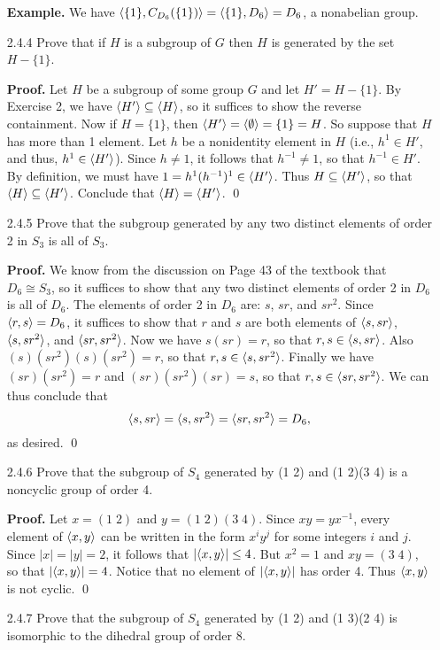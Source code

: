 \begin{enumerate}
      \textbf{Example.} We have $\langle \{1\}, C_{D_6}(\{1\}) \rangle =
      \langle \{1\}, D_6 \rangle= D_6$, a nonabelian group.
   \item[2.4.4]   Prove that if $H$ is a subgroup of $G$ then $H$ is generated
                  by the set $H - \{1\}$.

      \textbf{Proof.} Let $H$ be a subgroup of some group $G$ and let
      $H' = H - \{1\}$. By Exercise 2, we have $\langle H' \rangle \subseteq \langle H \rangle$, so
      it suffices to show the reverse containment. Now if $H = \{1\}$, then
      $\langle H' \rangle = \langle \emptyset \rangle = \{1\} = H$. So suppose that $H$ has more
      than 1 element. Let $h$ be a nonidentity element in $H$ (i.e.,
      $h^1 \in H'$, and thus, $h^1 \in \langle H' \rangle$).
      Since $h \neq 1$, it follows that $h^{-1} \neq 1$, so that
      $h^{-1} \in H'$. By definition, we must
      have $1 = h^1(h^{-1})^1 \in  \langle H' \rangle$. Thus $H \subseteq \langle H' \rangle$, so
      that $\langle H \rangle \subseteq \langle H' \rangle$. Conclude that
      $\langle H \rangle = \langle H' \rangle$. \qed
   \item[2.4.5]   Prove that the subgroup generated by any two distinct elements
                  of order 2 in $S_3$ is all of $S_3$.

      \textbf{Proof.} We know from the discussion on Page 43 of the textbook
      that $D_6 \cong S_3$, so it suffices to show that any two distinct
      elements of order 2 in $D_6$ is all of $D_6$. The elements of order 2 in
      $D_6$ are: $s$, $sr$, and $sr^2$. Since $\langle r, s \rangle = D_6$, it suffices to
      show that $r$ and $s$ are both elements of $\langle s, sr \rangle$, $\langle s, sr^2 \rangle$,
      and $\langle sr, sr^2 \rangle$. Now we have $s(sr) = r$, so that
      $r, s \in \langle s, sr \rangle$. Also $(s)(sr^2)(s)(sr^2) = r$, so that
      $r, s \in \langle s, sr^2 \rangle$. Finally we have $(sr)(sr^2) = r$ and
      $(sr)(sr^2)(sr) = s$, so that $r, s \in \langle sr, sr^2 \rangle$. We can thus
      conclude that
      $$\langle s, sr \rangle = \langle s, sr^2 \rangle = \langle sr, sr^2 \rangle = D_6,$$
      as desired. \qed
   \item[2.4.6]   Prove that the subgroup of $S_4$ generated by (1 2) and
                  (1 2)(3 4) is a noncyclic group of order 4.

      \textbf{Proof.} Let $x = (1\;2)$ and $y = (1\;2)(3\;4)$. Since
      $xy = yx^{-1}$, every element of $\langle x, y \rangle$ can be written in the form 
      $x^iy^j$ for some integers $i$ and $j$. Since $|x| = |y| = 2$, it follows
      that $|\langle x, y \rangle| \le 4$. But $x^2 = 1$ and $xy = (3\;4)$, so that
      $|\langle x, y \rangle| = 4$. Notice that no element of $|\langle x, y \rangle|$ has order 4. 
      Thus $\langle x, y \rangle$ is not cyclic. \qed
   \item[2.4.7]   Prove that the subgroup of $S_4$ generated by (1 2) and
                  (1 3)(2 4) is isomorphic to the dihedral group of order 8.


\end{enumerate}
